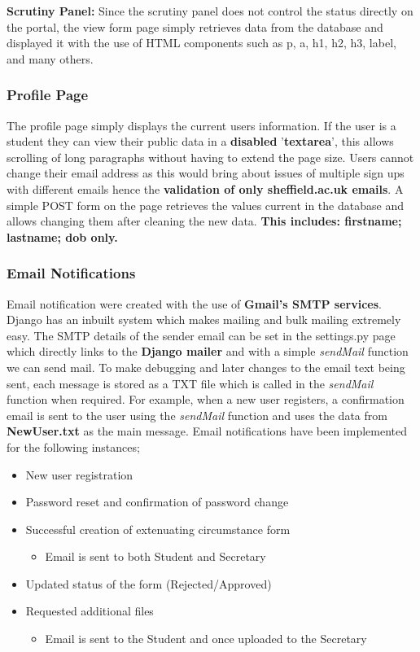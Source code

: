 \documentclass[../main.tex]{subfiles}
\begin{document}
\textbf{Scrutiny Panel:} Since the scrutiny panel does not control the status directly on the portal, the view form page simply retrieves data from the database and displayed it with the use of HTML components such as p, a, h1, h2, h3, label, and many others. 

\subsubsection{Profile Page} 
The profile page simply displays the current users information. If the user is a student they can view their public data in a \textbf{disabled} '\textbf{textarea}', this allows scrolling of long paragraphs without having to extend the page size. Users cannot change their email address as this would bring about issues of multiple sign ups with different emails hence the \textbf{validation of only sheffield.ac.uk emails}. A simple POST form on the page retrieves the values current in the database and allows changing them after cleaning the new data. \textbf{This includes: firstname; lastname; dob only. }

\subsubsection{Email Notifications} 
Email notification were created with the use of \textbf{Gmail's SMTP services}. Django has an inbuilt system which makes mailing and bulk mailing extremely easy. The SMTP details of the sender email can be set in the settings.py page which directly links to the \textbf{Django mailer} and with a simple \textit{sendMail} function we can send mail. To make debugging and later changes to the email text being sent, each message is stored as a TXT file which is called in the \textit{sendMail} function when required. For example, when a new user registers, a confirmation email is sent to the user using the \textit{sendMail} function and uses the data from \textbf{NewUser.txt} as the main message. Email notifications have been implemented for the following instances;

\begin{itemize}
  \item New user registration
  \item Password reset and confirmation of password change
  \item Successful creation of extenuating circumstance form
  	\begin{itemize}
     \item Email is sent to both Student and Secretary
    \end{itemize}
  \item Updated status of the form (Rejected/Approved)
  \item Requested additional files
  	\begin{itemize}
     \item Email is sent to the Student and once uploaded to the Secretary
    	\end{itemize} 
\end{itemize}
\end{document}
